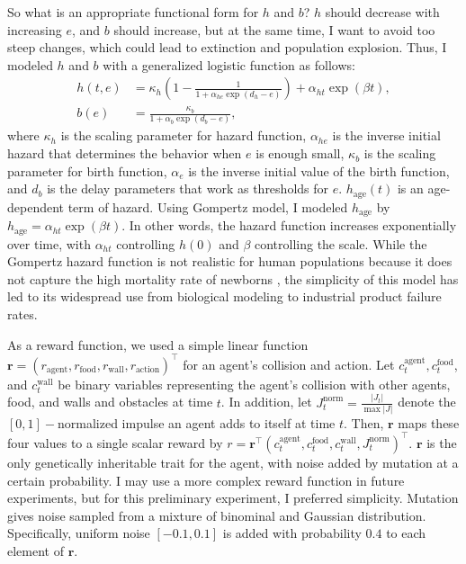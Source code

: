 So what is an appropriate functional form for $h$ and $b$? $h$ should decrease with increasing $e$, and $b$ should increase, but at the same time, I want to avoid too steep changes, which could lead to extinction and population explosion. Thus, I modeled $h$ and $b$ with a generalized logistic function \citep{richardsFlexibleGrowthFunction1959} as follows:
\begin{align}
  h(t, e) &= \kappa_{h} \left(1 - \frac{1}{1 + \alpha_{he} \exp(d_{h} - e)} \right) + \alpha_{ht} \exp(\beta t), \\
  b(e) &=  \frac{\kappa_{b}}{1 + \alpha_{b}\exp(d_{b} - e)},
\end{align}
where $\kappa_{h}$ is the scaling parameter for hazard function, $\alpha_{he}$ is the inverse initial hazard that determines the behavior when $e$ is enough small, $\kappa_{b}$ is the scaling parameter for birth function, $\alpha_{e}$ is the inverse initial value of the birth function, and $d_{b}$ is the delay parameters that work as thresholds for $e$. $h_{\textrm{age}}(t)$ is an age-dependent term of hazard. Using Gompertz model\citep{gompertzXXIVNatureFunction1825,kirkwoodDecipheringDeathCommentary2015}, I modeled $h_{\textrm{age}}$ by $h_{\textrm{age}} = \alpha_{ht} \exp(\beta t)$. In other words, the hazard function increases exponentially over time, with $\alpha_{ht}$ controlling $h(0)$ and $\beta$ controlling the scale. While the Gompertz hazard function is not realistic for human populations because it does not capture the high mortality rate of newborns \citep{makehamLawMortalityConstruction1860}, the simplicity of this model has led to its widespread use from biological modeling to industrial product failure rates.

As a reward function, we used a simple linear function $\mathbf{r} = \left(r_{\textrm{agent}}, r_{\textrm{food}}, r_{\textrm{wall}}, r_{\textrm{action}} \right)^{\intercal} $ for an agent's collision and action. Let $c_{t}^{\textrm{agent}}, c_{t}^{\textrm{food}}$, and $c_{t}^{\textrm{wall}}$ be binary variables representing the agent's collision with other agents, food, and walls and obstacles at time $t$. In addition, let $J_{t}^{\textrm{norm}} = \frac{|J_{t}|}{\max{|J|}}$ denote the $[0, 1]-$normalized impulse an agent adds to itself at time $t$. Then, $\mathbf{r}$ maps these four values to a single scalar reward by $r = \mathbf{r}^{\intercal} (c_{t}^{\textrm{agent}}, c_{t}^{\textrm{food}}, c_{t}^{\textrm{wall}}, J_{t}^{\textrm{norm}})^{\intercal}$. $\mathbf{r}$ is the only genetically inheritable trait for the agent, with noise added by mutation at a certain probability. I may use a more complex reward function in future experiments, but for this preliminary experiment, I preferred simplicity. Mutation gives noise sampled from a mixture of binominal and Gaussian distribution. Specifically, uniform noise $[-0.1, 0.1]$ is added with probability $0.4$ to each element of $\mathbf{r}$.

